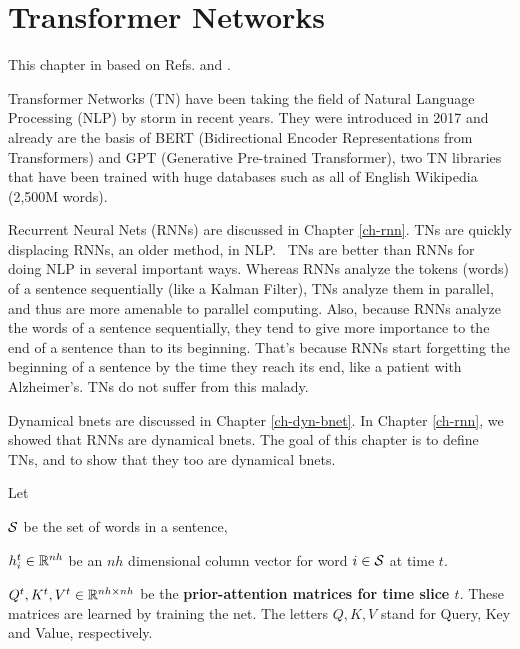 \chapter{Transformer Networks}
\label{ch-transformer}

This chapter in based on Refs.\cite{joshi-trans}
and \cite{wiki-transformer}.

Transformer Networks (TN)
have been taking the field of
Natural Language Processing (NLP)
by storm in recent years.
They were introduced in 2017 and already
are the basis of
BERT (Bidirectional Encoder
Representations from Transformers)
and GPT (Generative Pre-trained Transformer),
two TN libraries that
have been trained with
huge databases such as all of
English Wikipedia (2,500M words).

Recurrent Neural Nets (RNNs)
are discussed in Chapter \ref{ch-rnn}.
TNs are quickly displacing RNNs, 
an older method, in NLP.  TNs are better than RNNs 
for doing NLP in several important ways. Whereas
 RNNs analyze the tokens (words) of a sentence 
sequentially (like a Kalman Filter), 
TNs analyze them in parallel, and thus are more
 amenable to parallel computing. Also, because
 RNNs analyze the words of a sentence sequentially, 
they tend to give more importance to the end 
of a sentence than to its beginning. That's because 
RNNs start forgetting the beginning of a sentence
 by the time they reach its end, like a patient 
with Alzheimer's. TNs do not suffer from this malady.

Dynamical bnets are discussed in Chapter \ref{ch-dyn-bnet}.
In Chapter \ref{ch-rnn},
we showed that RNNs
are dynamical bnets.
The goal of
this chapter
is to define TNs,
and to show that they too are
dynamical bnets.

Let

${\cal S}$ be the
set of words in a sentence,

$h^t_i\in { \mathbb{R}}^{nh}$ be
an $nh$ dimensional column vector
for word $i\in {\cal S}$ at time $t$.

$Q^t, K^t, V^t\in { \mathbb{R}}^{nh\times nh}$
be the  {\bf prior-attention matrices for time
slice $t$}.
These matrices are learned by training
the net.
The letters $Q,K,V$ stand for
 Query, Key and Value,
respectively.


